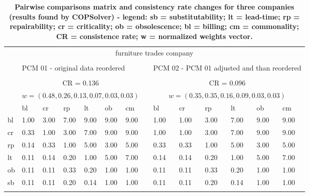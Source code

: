 \documentclass[10pt,fleqn,a4paper,twoside]{article}
\begin{document}
\begin{table}[ht]
            \begin{center}
                \caption{\textbf{Pairwise comparisons matrix and consistency rate changes for three companies 					(results found by COPSolver) - legend: sb = substitutability; lt = lead-time; rp = repairability; cr = criticality; ob = obsolescence; bl = billing; cm = commonality; CR = consistence rate; w = normalized weights vector.}}
                    \begin{tabular}[l]{p{0.4cm} p{0.5cm} p{0.5cm} p{0.5cm} p{0.5cm} p{0.5cm} p{0.5cm} p{0.1cm} | p{0.5cm} p{0.5cm} p{0.5cm} p{0.5cm} p{0.5cm} p{0.5cm}}
                        \\
   						\multicolumn{14}{c}{furniture trades company} \\
   						\cline {1-14} \\
   						& \multicolumn{6}{l}{PCM 01 - original data reordered} & & \multicolumn{6}{l}{PCM 02 - PCM 01 adjusted and than reordered} \\
						\cline {1-14} \\
  						& \multicolumn{6}{c}{CR = 0.136}  & & \multicolumn{6}{c}{CR = 0.096} \\
  						& \multicolumn{6}{c}{$w=(0.48, 0.26, 0.13, 0.07, 0.03, 0.03)$} & & \multicolumn{6}{c}{$w = (0.35, 0.35, 0.16, 0.09, 0.03, 0.03)$} \\
   						& bl & cr & rp & lt & ob & cm & & bl & cr & rp & lt & ob & cm \\        
						bl & 1.00 & 3.00 & 7.00 & 9.00 & 9.00 & 9.00 & & 1.00 & \cellcolor[HTML]{ACE600} 1.00 & \cellcolor[HTML]{ACE600} 3.00 & \cellcolor[HTML]{ACE600} 7.00 & 9.00 & 9.00 \\
						cr & 0.33 & 1.00 & 3.00 & 7.00 & 9.00 & 9.00 & & \cellcolor[HTML]{ACE600} 1.00 & 1.00 & 3.00 & 7.00 & 9.00 & 9.00 \\
						rp & 0.14 & 0.33 & 1.00 & 5.00 & 3.00 & 5.00 & & \cellcolor[HTML]{ACE600} 0.33 & 0.33 & 1.00 & 5.00 & 3.00 & 5.00 \\
						lt & 0.11 & 0.14 & 0.20 & 1.00 & 5.00 & 7.00 & & \cellcolor[HTML]{ACE600} 0.14 & 0.14 & 0.20 & 1.00 & 5.00 & 7.00 \\
						ob & 0.11 & 0.11 & 0.33 & 0.20 & 1.00 & 1.00 & & 0.11 & 0.11 & 0.33 & 0.20 & 1.00 & 1.00 \\
						sb & 0.11 & 0.11 & 0.20 & 0.14 & 1.00 & 1.00 & & 0.11 & 0.11 & 0.20 & 0.14 & 1.00 & 1.00 \\
						\cline {1-14} \\

\end{tabular}
\end{center}
\end{table}
\end{document}
